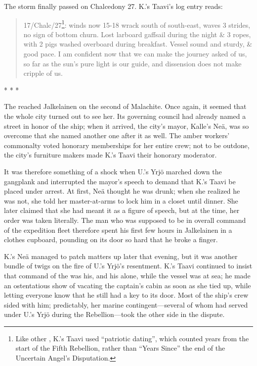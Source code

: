 \documentclass[12pt]{report}
\begin{document}
The storm finally passed on Chalcedony 27.  K.'s Taavi's log entry
reads:

\begin{quotation}
17/Chalc/27\footnote{Like other {\aemott}, K.'s Taavi used ``patriotic
dating'', which counted years from the start of the Fifth Rebellion,
rather than ``Years Since'' the end of the Uncertain Angel's
Disputation.}: winds now 15-18 wrack south of south-east, waves 3
strides, no sign of bottom churn.  Lost larboard gaffsail during the
night \& 3 ropes, with 2 pigs washed overboard during breakfast.
Vessel sound and sturdy, \& good pace.  I am confident now that we can
make the journey asked of us, so far as the sun's pure light is our
guide, and dissension does not make cripple of us.
\end{quotation}

\begin{center}
* * *
\end{center}

The  reached Jalkelainen on the second of
Malachite.  Once again, it seemed that the whole city turned out to
see her.  Its governing council had already named a street in honor of
the ship; when it arrived, the city's mayor, Kalle's Ne\"a, was so
overcome that she named another one after it as well.  The amber
workers' commonalty voted honorary memberships for her entire crew;
not to be outdone, the city's furniture makers made K.'s Taavi their
honorary moderator.

It was therefore something of a shock when U.'s Yrj\"{o} marched down
the gangplank and interrupted the mayor's speech to demand that K.'s
Taavi be placed under arrest.  At first, Ne\"a thought he was drunk;
when she realized he was not, she told her master-at-arms to lock him
in a closet until dinner.  She later claimed that she had meant it as
a figure of speech, but at the time, her order was taken literally.
The man who was supposed to be in overall command of the expedition
fleet therefore spent his first few hours in Jalkelainen in a clothes
cupboard, pounding on its door so hard that he broke a finger.

K.'s Ne\"a managed to patch matters up later that evening, but it was
another bundle of twigs on the fire of U.'s Yrj\"{o}'s resentment.
K.'s Taavi continued to insist that command of the  was his, and his alone, while the vessel was at sea; he
made an ostentatious show of vacating the captain's cabin as soon as
she tied up, while letting everyone know that he still had a key to
its door.  Most of the ship's crew sided with him; predictably, her
marine contingent---several of whom had served under U.'s Yrj\"{o}
during the Rebellion---took the other side in the dispute.
\end{document}
